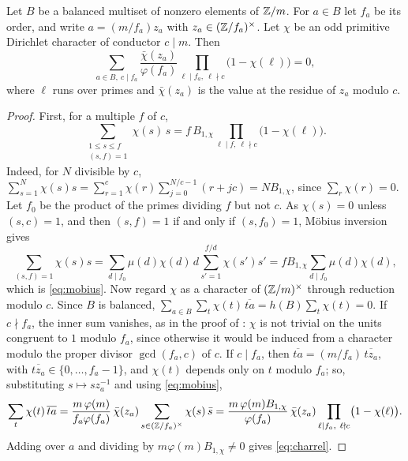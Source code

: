 \begin{lemma}\label{lem:charrel}
Let $B$ be a balanced multiset of nonzero elements of $\mathbb{Z}/m$. For $a\in B$
let $f_{a}$ be its order, and write $a=(m/f_{a})z_{a}$ with $z_{a}\in
(\mathbb{Z}/f_{a})^{\times}$. Let $\chi$ be an odd primitive Dirichlet character of
conductor $c\mid m$. Then
\begin{equation}\label{eq:charrel}
  \sum_{a\in B,\ c\mid f_{a}}\frac{\bar\chi(z_{a})}{\varphi(f_{a})}
  \prod_{\ell\mid f_{a},\ \ell\nmid c}\bigl(1-\chi(\ell)\bigr)=0,
\end{equation}
where $\ell$ runs over primes and $\bar\chi(z_{a})$ is the value at the
residue of $z_{a}$ modulo $c$.
\end{lemma}

\begin{proof}
First, for a multiple $f$ of $c$,
\begin{equation}\label{eq:mobius}
  \sum_{\substack{1\le s\le f\\ (s,f)=1}}\chi(s)\,s=f\,B_{1,\chi}
  \prod_{\ell\mid f,\ \ell\nmid c}\bigl(1-\chi(\ell)\bigr).
\end{equation}
Indeed, for $N$ divisible by $c$, $\sum_{s=1}^{N}\chi(s)s=\sum_{r=1}^{c}
\chi(r)\sum_{j=0}^{N/c-1}(r+jc)=NB_{1,\chi}$, since $\sum_{r}\chi(r)=0$. Let
$f_{0}$ be the product of the primes dividing $f$ but not $c$. As $\chi(s)=0$
unless $(s,c)=1$, and then $(s,f)=1$ if and only if $(s,f_{0})=1$, Möbius
inversion gives
\[
  \sum_{(s,f)=1}\chi(s)s=\sum_{d\mid f_{0}}\mu(d)\chi(d)\,d\sum_{s'=1}^{f/d}
  \chi(s')s'=fB_{1,\chi}\sum_{d\mid f_{0}}\mu(d)\chi(d),
\]
which is \eqref{eq:mobius}. Now regard $\chi$ as a character of
$(\mathbb{Z}/m)^{\times}$ through reduction modulo $c$. Since $B$ is balanced,
$\sum_{a\in B}\sum_{t}\chi(t)\,\overline{ta}=h(B)\sum_{t}\chi(t)=0$. If
$c\nmid f_{a}$, the inner sum vanishes, as in the proof of
: $\chi$ is not trivial on the units congruent to $1$
modulo $f_{a}$, since otherwise it would be induced from a character modulo
the proper divisor $\gcd(f_{a},c)$ of $c$. If $c\mid f_{a}$, then
$\overline{ta}=(m/f_{a})\,\overline{tz_{a}}$, with $\overline{tz_{a}}\in
\{0,\dots,f_{a}-1\}$, and $\chi(t)$ depends only on $t$ modulo $f_{a}$; so,
substituting $s\mapsto sz_{a}^{-1}$ and using \eqref{eq:mobius},
\[
  \sum_{t}\chi(t)\,\overline{ta}=\frac{m\,\varphi(m)}{f_{a}\varphi(f_{a})}
  \,\bar\chi(z_{a})\sum_{s\in(\mathbb{Z}/f_{a})^{\times}}\chi(s)\,\bar s
  =\frac{m\,\varphi(m)B_{1,\chi}}{\varphi(f_{a})}\,\bar\chi(z_{a})
  \prod_{\ell\mid f_{a},\ \ell\nmid c}\bigl(1-\chi(\ell)\bigr).
\]
Adding over $a$ and dividing by $m\varphi(m)B_{1,\chi}\ne0$ gives
\eqref{eq:charrel}.
\end{proof}

